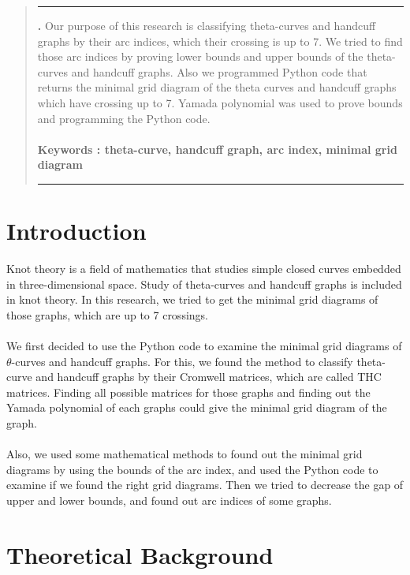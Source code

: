\documentclass{article}
\theoremstyle{definition}
\theoremstyle{theorem}
\theoremstyle{proposition}
\theoremstyle{corollary}
\begin{document}
\renewenvironment{abstract}
{\begin{quote}
\noindent \rule{\linewidth}{.5pt}\par{\bfseries \abstractname.}}
{\medskip\noindent \rule{\linewidth}{.5pt}
\end{quote}
}

\begin{abstract}
Our purpose of this research is classifying theta-curves and handcuff graphs by their arc indices, which their crossing is up to 7.
We tried to find those arc indices by proving lower bounds and upper bounds of the theta-curves and handcuff graphs.
Also we programmed Python code that returns the minimal grid diagram of the theta curves and handcuff graphs which have crossing up to 7.
Yamada polynomial was used to prove bounds and programming the Python code.\\ \\
\textbf{Keywords : theta-curve, handcuff graph, arc index, minimal grid diagram}
\\
\end{abstract}

\newpage
\section{Introduction}
Knot theory is a field of mathematics that studies simple closed curves embedded in three-dimensional space. Study of theta-curves and handcuff graphs is included in knot theory. In this research, we tried to get the minimal grid diagrams of those graphs, which are up to 7 crossings.\\ \\
We first decided to use the Python code to examine the minimal grid diagrams of $\theta$-curves and handcuff graphs. For this, we found the method to classify theta-curve and handcuff graphs by their Cromwell matrices, which are called THC matrices. Finding all possible matrices for those graphs and finding out the Yamada polynomial of each graphs could give the minimal grid diagram of the graph. \\ \\
Also, we used some mathematical methods to found out the minimal grid diagrams by using the bounds of the arc index, and used the Python code to examine if we found the right grid diagrams. Then we tried to decrease the gap of upper and lower bounds, and found out arc indices of some graphs.

\section{Theoretical Background}
\end{document}
